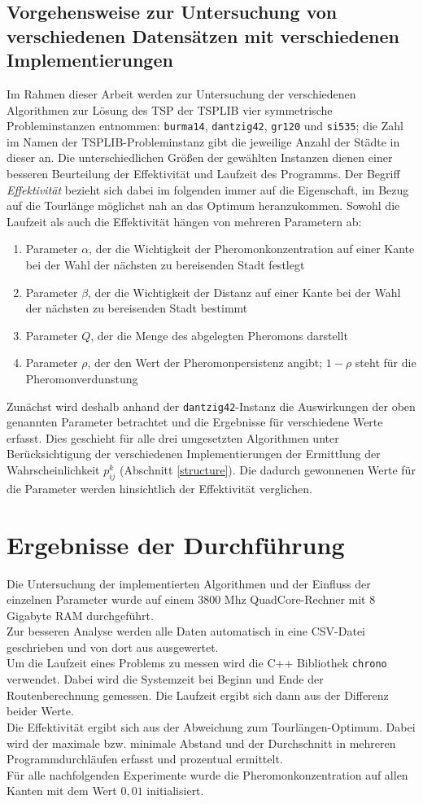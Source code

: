 \documentclass[doktyp=barbeit, sprache=german]{TUBAFarbeiten}
\begin{document}
\subsection{Vorgehensweise zur Untersuchung von verschiedenen Datensätzen mit verschiedenen Implementierungen}
\label{sec:vorgehensweise}
Im Rahmen dieser Arbeit werden zur Untersuchung der verschiedenen Algorithmen zur Lösung des TSP der TSPLIB vier symmetrische Probleminstanzen entnommen: \texttt{burma14}, \texttt{dantzig42}, \texttt{gr120} und \texttt{si535}; die Zahl im Namen der TSPLIB-Probleminstanz gibt die jeweilige Anzahl der Städte in dieser an.
Die unterschiedlichen Größen der gewählten Instanzen dienen einer besseren Beurteilung der Effektivität und Laufzeit des Programms.
Der Begriff \textit{Effektivität} bezieht sich dabei im folgenden immer auf die Eigenschaft, im Bezug auf die Tourlänge möglichst nah an das Optimum heranzukommen. Sowohl die Laufzeit als auch die Effektivität hängen von mehreren Parametern ab:
\begin{enumerate}
\item Parameter $\alpha$, der die Wichtigkeit der Pheromonkonzentration auf einer Kante bei der Wahl der nächsten zu bereisenden Stadt festlegt
\item Parameter $\beta$, der die Wichtigkeit der Distanz auf einer Kante bei der Wahl der nächsten zu bereisenden Stadt bestimmt
\item Parameter $Q$, der die Menge des abgelegten Pheromons darstellt
\item Parameter $\rho$, der den Wert der Pheromonpersistenz angibt; $1 - \rho$ steht für die Pheromonverdunstung
\end{enumerate}
\newpage
Zunächst wird deshalb anhand der \texttt{dantzig42}-Instanz die Auswirkungen der oben genannten Parameter betrachtet und die Ergebnisse für verschiedene Werte erfasst.
Dies geschieht für alle drei umgesetzten Algorithmen unter Berücksichtigung der verschiedenen Implementierungen der Ermittlung der Wahrscheinlichkeit $p^k_{ij}$ (Abschnitt \ref{structure}).
Die dadurch gewonnenen Werte für die Parameter werden hinsichtlich der Effektivität verglichen. 
\newpage\section{Ergebnisse der Durchführung}
Die Untersuchung der implementierten Algorithmen und der Einfluss der einzelnen Parameter wurde auf einem 3800 Mhz QuadCore-Rechner mit 8 Gigabyte RAM durchgeführt. 
\\Zur besseren Analyse werden alle Daten automatisch in eine CSV-Datei geschrieben und von dort aus ausgewertet.
\\Um die Laufzeit eines Problems zu messen wird die C++ Bibliothek \texttt{chrono} verwendet. Dabei wird die Systemzeit bei Beginn und Ende der Routenberechnung gemessen. Die Laufzeit ergibt sich dann aus der Differenz beider Werte. 
\\Die Effektivität ergibt sich aus der Abweichung zum Tourlängen-Optimum. Dabei wird der maximale bzw. minimale Abstand und der Durchschnitt in mehreren Programmdurchläufen erfasst und prozentual ermittelt.
\\Für alle nachfolgenden Experimente wurde die Pheromonkonzentration auf allen Kanten mit dem Wert $0,01$ initialisiert.
\end{document}
